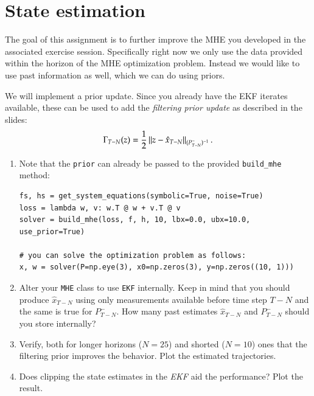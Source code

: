 \documentclass[]{article}
\begin{document}
\section{State estimation}
The goal of this assignment is to further improve the MHE you developed in the 
associated exercise session. Specifically right now we only use the data 
provided within the horizon of the MHE optimization problem. Instead 
we would like to use past information as well, which we can do using priors. 
\begin{assignment}
 	We will implement a prior update. Since you already 
    have the EKF iterates available, these can be used to add the \emph{filtering prior update}
    as described in the slides:
    \begin{equation*}
        \Gamma_{T-N}(z) = \frac{1}{2} \left\|z - \hat{x}_{T-N}\right\|_{(P^-_{T-N})^{-1}}.
    \end{equation*}
    \begin{enumerate}
        \item Note that the \texttt{prior} can already be passed to the provided \texttt{build\_mhe} method:
        \begin{lstlisting}[style=python]
fs, hs = get_system_equations(symbolic=True, noise=True)
loss = lambda w, v: w.T @ w + v.T @ v
solver = build_mhe(loss, f, h, 10, lbx=0.0, ubx=10.0, use_prior=True)

# you can solve the optimization problem as follows:
x, w = solver(P=np.eye(3), x0=np.zeros(3), y=np.zeros((10, 1)))
\end{lstlisting}
        
        \item Alter your \texttt{MHE} class to use \texttt{EKF} internally. 
        Keep in mind that you should produce $\hat{x}_{T-N}$ using only measurements 
        available before time step $T-N$ and the same is true for $P^-_{T-N}$. 
        How many past estimates $\hat{x}_{T-N}$ and $P^-_{T-N}$ should you store 
        internally?

        \item Verify, both for longer horizons ($N = 25$) and shorted ($N=10$) ones
        that the filtering prior improves the behavior. Plot the estimated 
		trajectories.
        
        \item Does clipping the state estimates in the \emph{EKF} aid the 
        performance? Plot the result.
    \end{enumerate}
\end{assignment}
\end{document}
